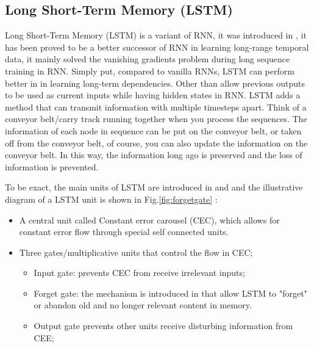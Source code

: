 \documentclass{article}
\begin{document}
\subsection{Long Short-Term Memory (LSTM) }

Long Short-Term Memory (LSTM) is a variant of RNN, it was introduced in
\cite{4-lstm}, it has been proved to be a better successor of RNN in learning
long-range temporal data, it
mainly solved the vanishing gradients problem during long sequence training in
RNN.
Simply put, compared to vanilla RNNs, LSTM can perform better in in learning
long-term dependencies. Other than allow previous outputs to be used as current
inputs while having hidden
states in RNN. LSTM adds a method that can transmit information with multiple
timesteps apart. Think of a conveyor belt/carry track running together when you
process the sequences. The information of each node in sequence can be put on
the conveyor belt, or taken off from the conveyor belt, of course, you can also
update the information on the conveyor belt. In this way, the information long
ago is preserved and the loss of information is prevented.

To be exact, the main units of LSTM are introduced in \cite{4-lstm} and
\cite{5-forgetgate} and the illustrative diagram of a LSTM unit is shown in
Fig.\ref{fig:forgetgate} :
\begin{itemize}
	\setlength{\itemsep}{1pt}
	\setlength{\parskip}{0pt}
	\setlength{\parsep}{0pt}
  \item A central unit called Constant error carousel (CEC), which allows for
constant error flow
through special self connected units.
  \item Three gates/multiplicative units that control the flow in CEC;
  \begin{itemize}
 		\item Input gate: prevents CEC from receive irrelevant inputs; 
		\item Forget gate: the mechanism is introduced in \cite{5-forgetgate} that
allow LSTM to "forget" or abandon old and no longer relevant content in
memory.
 		\item Output gate prevents other units receive disturbing information from
CEE;
	\end{itemize}
\end{itemize}
\end{document}
